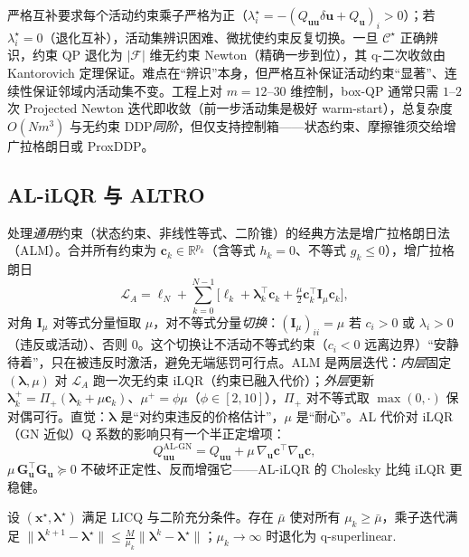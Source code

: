 严格互补要求每个活动约束乘子严格为正（$\lambda_i^\star=-(Q_{\mathbf{uu}}\delta\mathbf{u}+Q_{\mathbf{u}})_i>0$）；若 $\lambda_i^\star=0$（退化互补），活动集辨识困难、微扰使约束反复切换。一旦 $\mathcal{C}^\star$ 正确辨识，约束 QP 退化为 $|\mathcal{F}|$ 维无约束 Newton（精确一步到位），其 q-二次收敛由 Kantorovich 定理保证。难点在“辨识”本身，但严格互补保证活动约束“显著”、连续性保证邻域内活动集不变。工程上对 $m=12$--$30$ 维控制，box-QP 通常只需 $1$--$2$ 次 Projected Newton 迭代即收敛（前一步活动集是极好 warm-start），总复杂度 $O(Nm^3)$ 与无约束 DDP\emph{同阶}，但仅支持控制箱——状态约束、摩擦锥须交给增广拉格朗日或 ProxDDP。

\subsection{AL-iLQR 与 ALTRO}
\label{sec:ddp-altro}

处理\emph{通用}约束（状态约束、非线性等式、二阶锥）的经典方法是增广拉格朗日法（ALM）。合并所有约束为 $\mathbf{c}_k\in\mathbb{R}^{p_k}$（含等式 $h_k=0$、不等式 $g_k\le0$），增广拉格朗日
\begin{equation}
  \mathcal{L}_A=\ell_N+\sum_{k=0}^{N-1}\Big[\ell_k+\boldsymbol{\lambda}_k^\top\mathbf{c}_k+\tfrac{\mu}2\mathbf{c}_k^\top\mathbf{I}_\mu\mathbf{c}_k\Big],
  \label{eq:ddp-LA}
\end{equation}
对角 $\mathbf{I}_\mu$ 对等式分量恒取 $\mu$，对不等式分量\emph{切换}：$(\mathbf{I}_\mu)_{ii}=\mu$ 若 $c_i>0$ 或 $\lambda_i>0$（违反或活动）、否则 $0$。这个切换让不活动不等式约束（$c_i<0$ 远离边界）“安静待着”，只在被违反时激活，避免无端惩罚可行点。ALM 是两层迭代：\emph{内层}固定 $(\boldsymbol{\lambda},\mu)$ 对 $\mathcal{L}_A$ 跑一次无约束 iLQR（约束已融入代价）；\emph{外层}更新 $\boldsymbol{\lambda}_k^+=\Pi_+(\boldsymbol{\lambda}_k+\mu\mathbf{c}_k)$、$\mu^+=\phi\mu$（$\phi\in[2,10]$），$\Pi_+$ 对不等式取 $\max(0,\cdot)$ 保对偶可行。直觉：$\boldsymbol{\lambda}$ 是“对约束违反的价格估计”，$\mu$ 是“耐心”。AL 代价对 iLQR（GN 近似）Q 系数的影响只有一个半正定增项：
\begin{equation}
  Q_{\mathbf{uu}}^{\mathrm{AL\text{-}GN}}=Q_{\mathbf{uu}}+\mu\,\nabla_{\mathbf{u}}\mathbf{c}^\top\nabla_{\mathbf{u}}\mathbf{c},
  \label{eq:ddp-al-quu}
\end{equation}
$\mu\,\mathbf{G}_{\mathbf{u}}^\top\mathbf{G}_{\mathbf{u}}\succeq0$ 不破坏正定性、反而增强它——AL-iLQR 的 Cholesky 比纯 iLQR 更稳健。

\begin{theorem}
\label{thm:ddp-al-conv}
设 $(\mathbf{x}^\star,\boldsymbol{\lambda}^\star)$ 满足 LICQ 与二阶充分条件。存在 $\bar\mu$ 使对所有 $\mu_k\ge\bar\mu$，乘子迭代满足 $\|\boldsymbol{\lambda}^{k+1}-\boldsymbol{\lambda}^\star\|\le\tfrac{M}{\mu_k}\|\boldsymbol{\lambda}^k-\boldsymbol{\lambda}^\star\|$；$\mu_k\to\infty$ 时退化为 q-superlinear\cite{bertsekas1982projected}.
\end{theorem}

